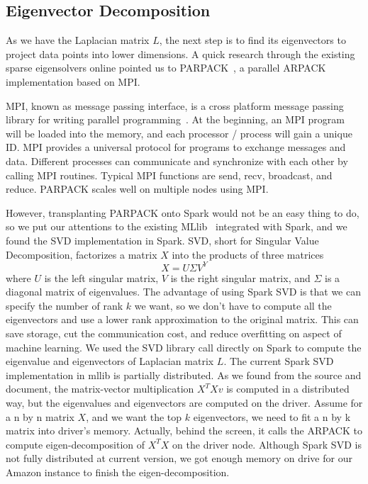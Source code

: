 \documentclass{acm_proc_article-sp}
\begin{document}
\subsection{Eigenvector Decomposition}
As we have the Laplacian matrix $L$, the next step is to find its eigenvectors to project data points into lower dimensions. A quick research through the existing sparse eigensolvers online pointed us to PARPACK~\cite{ding2011parallel}, a parallel ARPACK implementation based on MPI.

MPI, known as message passing interface, is a cross platform message passing library for writing parallel programming~\cite{gropp1996high}. At the beginning, an MPI program will be loaded into the memory, and each processor / process will gain a unique ID. MPI provides a universal protocol for programs to exchange messages and data. Different processes can communicate and synchronize with each other by calling MPI routines. Typical MPI functions are send, recv, broadcast, and reduce. PARPACK scales well on multiple nodes using MPI.

However, transplanting PARPACK onto Spark would not be an easy thing to do, so we put our attentions to the existing MLlib~\cite{mllib} integrated with Spark, and we found the SVD implementation in Spark. SVD, short for Singular Value Decomposition, factorizes a matrix $X$ into the products of three matrices $$X = U\Sigma V^Y$$ where $U$ is the left singular matrix, $V$ is the right singular matrix, and $\Sigma$ is a diagonal matrix of eigenvalues. The advantage of using Spark SVD is that we can specify the number of rank $k$ we want, so we don't have to compute all the eigenvectors and use a lower rank approximation to the original matrix. This can save storage, cut the communication cost, and reduce overfitting on aspect of machine learning. We used the SVD library call directly on Spark to compute the eigenvalue and eigenvectors of Laplacian matrix $L$. The current Spark SVD implementation in mllib is partially distributed. As we found from the source and document, the matrix-vector multiplication $X^TXv$ is computed in a distributed way, but the eigenvalues and eigenvectors are computed on the driver. Assume for a n by n matrix $X$, and we want the top $k$ eigenvectors, we need to fit a n by k matrix into driver's memory. Actually, behind the screen, it calls the ARPACK to compute eigen-decomposition of $X^TX$ on the driver node. Although Spark SVD is not fully distributed at current version, we got enough memory on drive for our Amazon instance to finish the eigen-decomposition.
\end{document}

